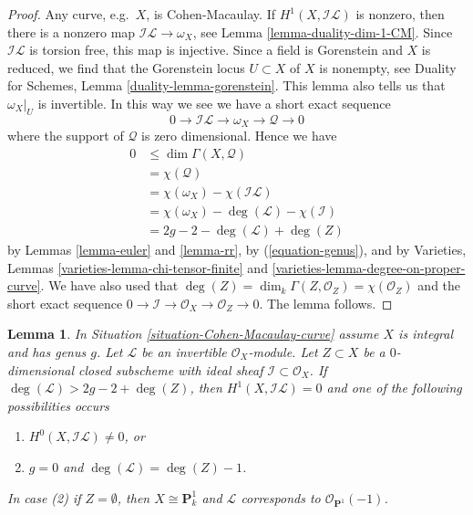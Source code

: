 \documentclass{stacks-project}
\newenvironment{reference}{\comment}{\endcomment}
\theoremstyle{plain}
\newtheorem{lemma}[subsection]{Lemma}
\theoremstyle{definition}
\theoremstyle{remark}
\numberwithin{equation}{subsection}
\begin{document}
\begin{proof}
Any curve, e.g.\ $X$, is Cohen-Macaulay.
If $H^1(X, \mathcal{I}\mathcal{L})$ is nonzero, then there is a nonzero
map $\mathcal{I}\mathcal{L} \to \omega_X$, see
Lemma \ref{lemma-duality-dim-1-CM}.
Since $\mathcal{I}\mathcal{L}$ is torsion free, this map is injective.
Since a field is Gorenstein and $X$ is reduced, we find
that the Gorenstein locus $U \subset X$ of $X$ is nonempty, see
Duality for Schemes, Lemma \ref{duality-lemma-gorenstein}.
This lemma also tells us that $\omega_X|_U$ is invertible.
In this way we see we have a short exact sequence
$$
0 \to \mathcal{I}\mathcal{L} \to \omega_X \to \mathcal{Q} \to 0
$$
where the support of $\mathcal{Q}$ is zero dimensional.
Hence we have
\begin{align*}
0 & \leq \dim \Gamma(X, \mathcal{Q})\\
& =
\chi(\mathcal{Q}) \\
& =
\chi(\omega_X) - \chi(\mathcal{I}\mathcal{L}) \\
& =
\chi(\omega_X) - \deg(\mathcal{L}) - \chi(\mathcal{I}) \\
& =
2g - 2 - \deg(\mathcal{L}) + \deg(Z)
\end{align*}
by Lemmas \ref{lemma-euler} and \ref{lemma-rr}, by (\ref{equation-genus}),
and by Varieties, Lemmas \ref{varieties-lemma-chi-tensor-finite}
and \ref{varieties-lemma-degree-on-proper-curve}. We have also used
that $\deg(Z) = \dim_k \Gamma(Z, \mathcal{O}_Z) = \chi(\mathcal{O}_Z)$
and the short exact sequence
$0 \to \mathcal{I} \to \mathcal{O}_X \to \mathcal{O}_Z \to 0$.
The lemma follows.
\end{proof}

\begin{lemma}
\label{lemma-degree-more-than-2g-2}
\begin{reference}
\cite[Lemma 2]{Jongmin}
\end{reference}
In Situation \ref{situation-Cohen-Macaulay-curve}
assume $X$ is integral and has genus $g$.
Let $\mathcal{L}$ be an invertible $\mathcal{O}_X$-module.
Let $Z \subset X$ be a $0$-dimensional closed subscheme with ideal
sheaf $\mathcal{I} \subset \mathcal{O}_X$.
If $\deg(\mathcal{L}) > 2g - 2 + \deg(Z)$, then
$H^1(X, \mathcal{I}\mathcal{L}) = 0$ and one of the following possibilities
occurs
\begin{enumerate}
\item $H^0(X, \mathcal{I}\mathcal{L}) \not = 0$, or
\item $g = 0$ and $\deg(\mathcal{L}) = \deg(Z) - 1$.
\end{enumerate}
In case (2) if $Z = \emptyset$, then $X \cong \mathbf{P}^1_k$ and $\mathcal{L}$
corresponds to $\mathcal{O}_{\mathbf{P}^1}(-1)$.
\end{lemma}
\end{document}

